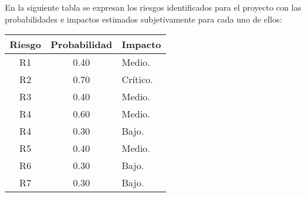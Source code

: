 \documentclass[12pt,a4paper]{article}
\begin{document}
En la siguiente tabla se expresan los riesgos identificados para el proyecto con las
probabilidades e impactos estimados subjetivamente para cada uno de ellos: 
\vspace{1 cm}
\begin{table}[h!]
\begin{tabular}{|c|c|p{8cm}|}
\hline
\textbf{Riesgo}&\textbf{Probabilidad}&\textbf{Impacto}
\\\hline
R1&0.40&Medio.\\\hline
R2&0.70&Crítico.\\\hline
R3&0.40&Medio.\\\hline
R4&0.60&Medio.\\\hline
R4&0.30&Bajo.\\\hline
R5&0.40&Medio.\\\hline
R6&0.30&Bajo.\\\hline
R7&0.30&Bajo.\\\hline
\end{tabular}
\end{table}
\end{document}
